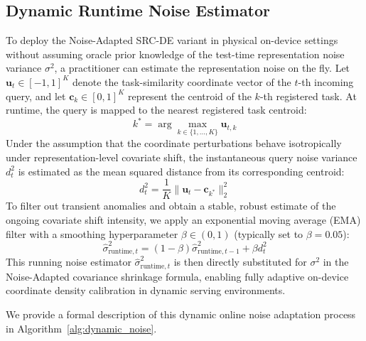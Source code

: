 \documentclass{article}
\theoremstyle{plain}
\theoremstyle{definition}
\theoremstyle{remark}
\begin{document}
\subsection{Dynamic Runtime Noise Estimator}
\label{sec:dynamic_noise_estimator}
To deploy the Noise-Adapted SRC-DE variant in physical on-device settings without assuming oracle prior knowledge of the test-time representation noise variance $\sigma^2$, a practitioner can estimate the representation noise on the fly. Let $\mathbf{u}_t \in [-1, 1]^K$ denote the task-similarity coordinate vector of the $t$-th incoming query, and let $\mathbf{c}_k \in [0, 1]^K$ represent the centroid of the $k$-th registered task. At runtime, the query is mapped to the nearest registered task centroid:
\begin{equation}
    k^* = \arg\max_{k \in \{1, \dots, K\}} \mathbf{u}_{t, k}
\end{equation}
Under the assumption that the coordinate perturbations behave isotropically under representation-level covariate shift, the instantaneous query noise variance $d_t^2$ is estimated as the mean squared distance from its corresponding centroid:
\begin{equation}
    d_t^2 = \frac{1}{K} \|\mathbf{u}_t - \mathbf{c}_{k^*}\|_2^2
\end{equation}
To filter out transient anomalies and obtain a stable, robust estimate of the ongoing covariate shift intensity, we apply an exponential moving average (EMA) filter with a smoothing hyperparameter $\beta \in (0, 1)$ (typically set to $\beta = 0.05$):
\begin{equation}
    \hat{\sigma}^2_{\text{runtime}, t} = (1 - \beta) \hat{\sigma}^2_{\text{runtime}, t-1} + \beta d_t^2
\end{equation}
This running noise estimator $\hat{\sigma}^2_{\text{runtime}, t}$ is then directly substituted for $\sigma^2$ in the Noise-Adapted covariance shrinkage formula, enabling fully adaptive on-device coordinate density calibration in dynamic serving environments.

We provide a formal description of this dynamic online noise adaptation process in Algorithm~\ref{alg:dynamic_noise}.
\end{document}
